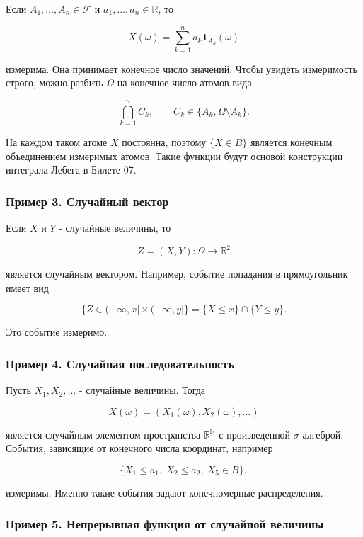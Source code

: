 \documentclass[
  11pt,
  a4paper,
]{article}
\begin{document}
Если \(A_1,\ldots,A_n\in\mathcal F\) и \(a_1,\ldots,a_n\in\mathbb R\),
то

\[
X(\omega)=\sum_{k=1}^n a_k\mathbf 1_{A_k}(\omega)
\]

измерима. Она принимает конечное число значений. Чтобы увидеть
измеримость строго, можно разбить \(\Omega\) на конечное число атомов
вида

\[
\bigcap_{k=1}^n C_k,\qquad C_k\in\{A_k,\Omega\setminus A_k\}.
\]

На каждом таком атоме \(X\) постоянна, поэтому \(\{X\in B\}\) является
конечным объединением измеримых атомов. Такие функции будут основой
конструкции интеграла Лебега в Билете 07.

\subsubsection{Пример 3. Случайный
вектор}\label{ux43fux440ux438ux43cux435ux440-3.-ux441ux43bux443ux447ux430ux439ux43dux44bux439-ux432ux435ux43aux442ux43eux440}

Если \(X\) и \(Y\) - случайные величины, то

\[
Z=(X,Y):\Omega\to\mathbb R^2
\]

является случайным вектором. Например, событие попадания в прямоугольник
имеет вид

\[
\{Z\in(-\infty,x]\times(-\infty,y]\}
=
\{X\le x\}\cap\{Y\le y\}.
\]

Это событие измеримо.

\subsubsection{Пример 4. Случайная
последовательность}\label{ux43fux440ux438ux43cux435ux440-4.-ux441ux43bux443ux447ux430ux439ux43dux430ux44f-ux43fux43eux441ux43bux435ux434ux43eux432ux430ux442ux435ux43bux44cux43dux43eux441ux442ux44c}

Пусть \(X_1,X_2,\ldots\) - случайные величины. Тогда

\[
X(\omega)=(X_1(\omega),X_2(\omega),\ldots)
\]

является случайным элементом пространства \(\mathbb R^{\mathbb N}\) с
произведенной \(\sigma\)-алгеброй. События, зависящие от конечного числа
координат, например

\[
\{X_1\le a_1,\ X_2\le a_2,\ X_5\in B\},
\]

измеримы. Именно такие события задают конечномерные распределения.

\subsubsection{Пример 5. Непрерывная функция от случайной
величины}\label{ux43fux440ux438ux43cux435ux440-5.-ux43dux435ux43fux440ux435ux440ux44bux432ux43dux430ux44f-ux444ux443ux43dux43aux446ux438ux44f-ux43eux442-ux441ux43bux443ux447ux430ux439ux43dux43eux439-ux432ux435ux43bux438ux447ux438ux43dux44b}
\end{document}
